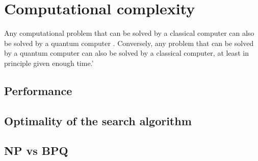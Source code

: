 \section{Computational complexity}
Any computational problem that can be solved by a classical computer can also be solved by a quantum computer \cite[29]{NielsenChuang}. Conversely, any problem that can be solved by a quantum computer can also be solved by a classical computer, at least in principle given enough time.'
\subsection{Performance}\label{sec:performance}
\subsection{Optimality of the search algorithm}

\subsection{NP vs BPQ}